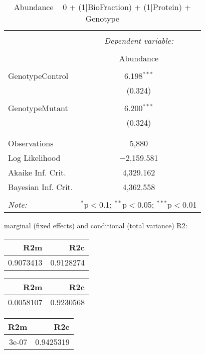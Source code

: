 \documentclass[11pt]{report}
\begin{document}
\begin{table}[!htbp] \centering 
  \caption{Abundance ~ 0 + (1|BioFraction) + (1|Protein) + Genotype} 
  \label{} 
\begin{tabular}{@{\extracolsep{5pt}}lc} 
\\[-1.8ex]\hline 
\hline \\[-1.8ex] 
 & \multicolumn{1}{c}{\textit{Dependent variable:}} \\ 
\cline{2-2} 
\\[-1.8ex] & Abundance \\ 
\hline \\[-1.8ex] 
 GenotypeControl & 6.198$^{***}$ \\ 
  & (0.324) \\ 
  & \\ 
 GenotypeMutant & 6.200$^{***}$ \\ 
  & (0.324) \\ 
  & \\ 
\hline \\[-1.8ex] 
Observations & 5,880 \\ 
Log Likelihood & $-$2,159.581 \\ 
Akaike Inf. Crit. & 4,329.162 \\ 
Bayesian Inf. Crit. & 4,362.558 \\ 
\hline 
\hline \\[-1.8ex] 
\textit{Note:}  & \multicolumn{1}{r}{$^{*}$p$<$0.1; $^{**}$p$<$0.05; $^{***}$p$<$0.01} \\ 
\end{tabular} 
\end{table} 
marginal (fixed effects) and conditional (total variance) R2:

\begin{tabular}{r|r}
\hline
R2m & R2c\\
\hline
0.9073413 & 0.9128274\\
\hline
\end{tabular}

\begin{tabular}{r|r}
\hline
R2m & R2c\\
\hline
0.0058107 & 0.9230568\\
\hline
\end{tabular}

\begin{tabular}{r|r}
\hline
R2m & R2c\\
\hline
3e-07 & 0.9425319\\
\hline
\end{tabular}
\end{document}
